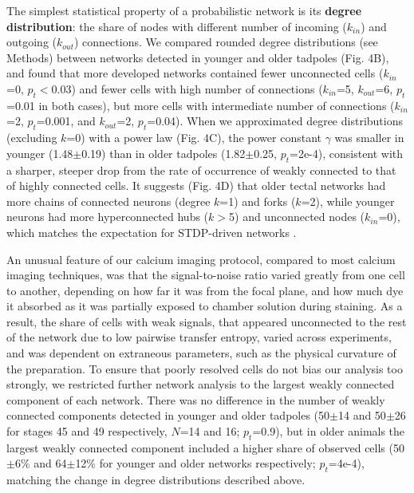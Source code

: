 \documentclass{article}
\begin{document}
The simplest statistical property of a probabilistic network is its \textbf{degree distribution}: the share of nodes with different number of incoming ($k_{in}$) and outgoing ($k_{out}$) connections. We compared rounded degree distributions (see Methods) between networks detected in younger and older tadpoles (Fig. 4B), and found that more developed networks contained fewer unconnected cells ($k_{in}$=0, $p_t<$0.03) and fewer cells with high number of connections ($k_{in}$=5, $k_{out}$=6, $p_t$=0.01 in both cases), but more cells with intermediate number of connections ($k_{in}$=2, $p_t$=0.001, and $k_{out}$=2, $p_t$=0.04). When we approximated degree distributions (excluding $k$=0) with a power law (Fig. 4C), the power constant $\gamma$ was smaller in younger (1.48$\pm$0.19) than in older tadpoles (1.82$\pm$0.25, $p_t$=2e-4), consistent with a sharper, steeper drop from the rate of occurrence of weakly connected to that of highly connected cells. It suggests (Fig. 4D) that older tectal networks had more chains of connected neurons (degree $k$=1) and forks ($k$=2), while younger neurons had more hyperconnected hubs ($k>$5) and unconnected nodes ($k_{in}$=0), which matches the expectation for STDP-driven networks \citep{fiete2010chains}.

An unusual feature of our calcium imaging protocol, compared to most calcium imaging techniques, was that the signal-to-noise ratio varied greatly from one cell to another, depending on how far it was from the focal plane, and how much dye it absorbed as it was partially exposed to chamber solution during staining. As a result, the share of cells with weak signals, that appeared unconnected to the rest of the network due to low pairwise transfer entropy, varied across experiments, and was dependent on extraneous parameters, such as the physical curvature of the preparation. To ensure that poorly resolved cells do not bias our analysis too strongly, we restricted further network analysis to the largest weakly connected component of each network. There was no difference in the number of weakly connected components detected in younger and older tadpoles (50$\pm$14 and 50$\pm$26 for stages 45 and 49 respectively, $N$=14 and 16; $p_t$=0.9), but in older animals the largest weakly connected component included a higher share of observed cells (50$\pm$6\% and 64$\pm$12\% for younger and older networks respectively; $p_t$=4e-4), matching the change in degree distributions described above.
\end{document}
